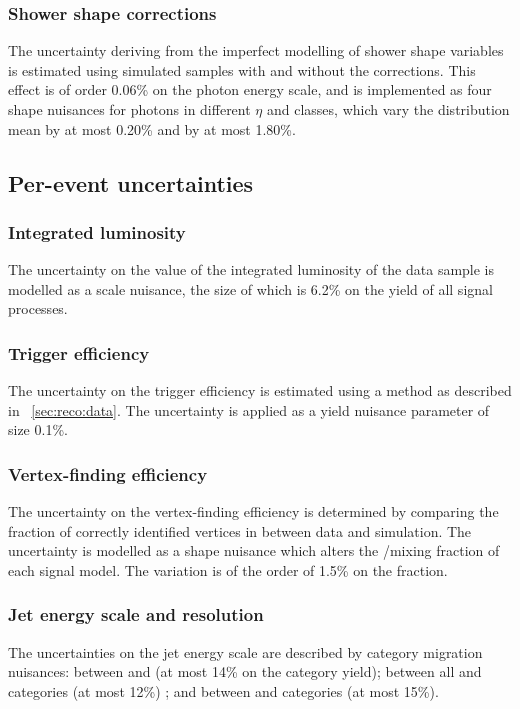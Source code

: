 \subsubsection{Shower shape corrections}
The uncertainty deriving from the imperfect modelling of shower shape variables is estimated using simulated samples with and without the corrections. This effect is of order 0.06\% on the photon energy scale, and is implemented as four shape nuisances for photons in different $\eta$ and \RNINE classes, which vary the \mgg distribution mean by at most 0.20\% and \effSigma by at most 1.80\%.

\subsection{Per-event uncertainties}

\subsubsection{Integrated luminosity}
The uncertainty on the value of the integrated luminosity of the data sample is modelled as a scale nuisance, the size of which is 6.2\% on the yield of all signal processes. 

\subsubsection{Trigger efficiency}
The uncertainty on the trigger efficiency is estimated using a \TagAndProbe method as described in \Sec~\ref{sec:reco:data}. The uncertainty is applied as a yield nuisance parameter of size 0.1\%.

\subsubsection{Vertex-finding efficiency}
The uncertainty on the vertex-finding efficiency is determined by comparing the fraction of correctly identified vertices in \Zmumu between data and simulation. The uncertainty is modelled as a shape nuisance which alters the \RV/\WV mixing fraction of each signal model. The variation is of the order of 1.5\% on the \RV fraction.

\subsubsection{Jet energy scale and resolution}
The uncertainties on the jet energy scale are described by category migration nuisances: between  and  (at most 14\% on the category yield); between all \VBF and \Untagged categories (at most 12\%) ; and between \TTHTag and \Untagged categories (at most 15\%).

